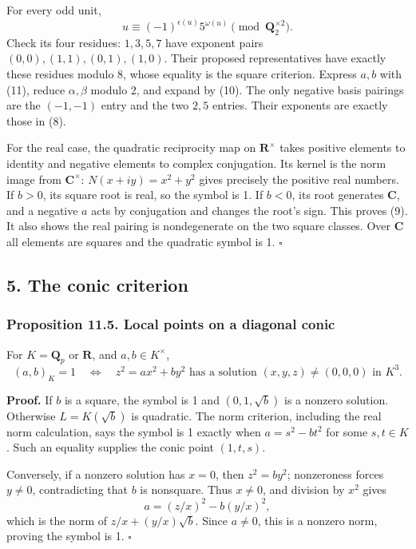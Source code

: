 \documentclass[11pt,a4paper]{article}
\begin{document}
For every odd unit, \[
u\equiv(-1)^{\epsilon(u)}5^{\omega(u)}
\pmod{\mathbf Q_2^{\times2}}.
\tag{11}
\] Check its four residues: \(1,3,5,7\) have exponent pairs
\((0,0),(1,1),(0,1),(1,0)\). Their proposed representatives have exactly
these residues modulo 8, whose equality is the square criterion. Express
\(a,b\) with (11), reduce \(\alpha,\beta\) modulo 2, and expand by (10).
The only negative basis pairings are the \((-1,-1)\) entry and the two
\(2,5\) entries. Their exponents are exactly those in (8).

For the real case, the quadratic reciprocity map on \(\mathbf R^\times\)
takes positive elements to identity and negative elements to complex
conjugation. Its kernel is the norm image from \(\mathbf C^\times\):
\(N(x+iy)=x^2+y^2\) gives precisely the positive real numbers. If
\(b>0\), its square root is real, so the symbol is 1. If \(b<0\), its
root generates \(\mathbf C\), and a negative \(a\) acts by conjugation
and changes the root's sign. This proves (9). It also shows the real
pairing is nondegenerate on the two square classes. Over \(\mathbf C\)
all elements are squares and the quadratic symbol is 1. \(\square\)

\subsection{5. The conic criterion}\label{the-conic-criterion}

\subsubsection{Proposition 11.5. Local points on a diagonal
conic}\label{proposition-11.5.-local-points-on-a-diagonal-conic}

For \(K=\mathbf Q_p\) or \(\mathbf R\), and \(a,b\in K^\times\), \[
(a,b)_K=1
\quad\Longleftrightarrow\quad
z^2=ax^2+by^2
\text{ has a solution }(x,y,z)\ne(0,0,0)\text{ in }K^3.
\tag{12}
\]

\textbf{Proof.} If \(b\) is a square, the symbol is 1 and
\((0,1,\sqrt b)\) is a nonzero solution. Otherwise \(L=K(\sqrt b)\) is
quadratic. The norm criterion, including the real norm calculation, says
the symbol is 1 exactly when \(a=s^2-bt^2\) for some \(s,t\in K\). Such
an equality supplies the conic point \((1,t,s)\).

Conversely, if a nonzero solution has \(x=0\), then \(z^2=by^2\);
nonzeroness forces \(y\ne0\), contradicting that \(b\) is nonsquare.
Thus \(x\ne0\), and division by \(x^2\) gives \[
a=(z/x)^2-b(y/x)^2,
\] which is the norm of \(z/x+(y/x)\sqrt b\). Since \(a\ne0\), this is a
nonzero norm, proving the symbol is 1. \(\square\)
\end{document}
